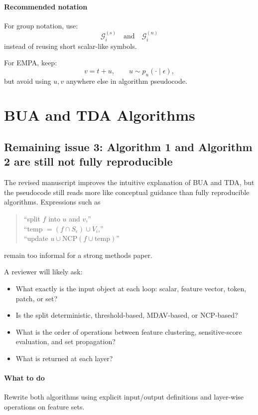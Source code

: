 \documentclass[11pt]{article}
\begin{document}
\paragraph{Recommended notation}
For group notation, use:
\begin{equation}
\mathcal{G}^{(s)}_i \quad \text{and} \quad \mathcal{G}^{(n)}_i
\label{eq:group-notation-safe}
\end{equation}
instead of reusing short scalar-like symbols.

For EMPA, keep:
\begin{equation}
v = t + u,
\qquad
u \sim p_u(\cdot \mid \epsilon),
\label{eq:obs-model-safe}
\end{equation}
but avoid using \(u,v\) anywhere else in algorithm pseudocode.

\section{BUA and TDA Algorithms}

\subsection*{Remaining issue 3: Algorithm 1 and Algorithm 2 are still not fully reproducible}
The revised manuscript improves the intuitive explanation of BUA and TDA, but the pseudocode still reads more like conceptual guidance than fully reproducible algorithms. Expressions such as
\begin{quote}
``split \(f\) into \(u\) and \(v\),'' \\
``temp \(=(f \cap S_\epsilon)\cup V_i\),'' \\
``update \(u \cup \text{NCP}(f \cup \text{temp})\)''
\end{quote}
remain too informal for a strong methods paper.

A reviewer will likely ask:
\begin{itemize}
    \item What exactly is the input object at each loop: scalar, feature vector, token, patch, or set?
    \item Is the split deterministic, threshold-based, MDAV-based, or NCP-based?
    \item What is the order of operations between feature clustering, sensitive-score evaluation, and set propagation?
    \item What is returned at each layer?
\end{itemize}

\paragraph{What to do}
Rewrite both algorithms using explicit input/output definitions and layer-wise operations on feature sets.
\end{document}
